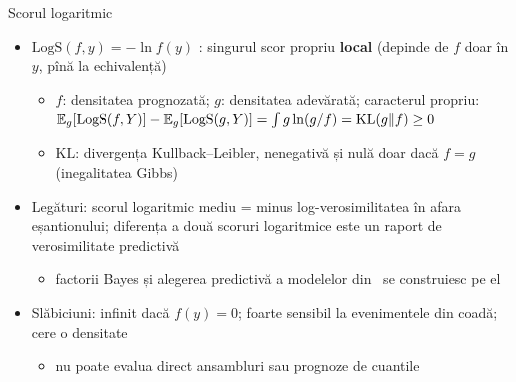 \begin{frame}{Scorul logaritmic}
\itemsize{\small}
\begin{itemize}
    \item $\mathrm{LogS}(f, y) = -\ln f(y)$ : singurul scor propriu \textbf{local} (depinde de $f$ doar în $y$, pînă la echivalență)
    \begin{itemize}
        \item $f$: densitatea prognozată; $g$: densitatea adevărată; caracterul propriu: $\mathbb{E}_g[\mathrm{LogS}(f, Y)] - \mathbb{E}_g[\mathrm{LogS}(g, Y)] = \int g \ln(g/f) = \mathrm{KL}(g \| f) \ge 0$
        \item $\mathrm{KL}$: divergența Kullback--Leibler, nenegativă și nulă doar dacă $f = g$ (inegalitatea Gibbs)
    \end{itemize}
    \item Legături: scorul logaritmic mediu = minus log-verosimilitatea în afara eșantionului; diferența a două scoruri logaritmice este un raport de verosimilitate predictivă
    \begin{itemize}
        \item factorii Bayes și alegerea predictivă a modelelor din \ se construiesc pe el
    \end{itemize}
    \item Slăbiciuni: infinit dacă $f(y) = 0$; foarte sensibil la evenimentele din coadă; cere o densitate
    \begin{itemize}
        \item nu poate evalua direct ansambluri sau prognoze de cuantile
    \end{itemize}
\end{itemize}
\end{frame}

